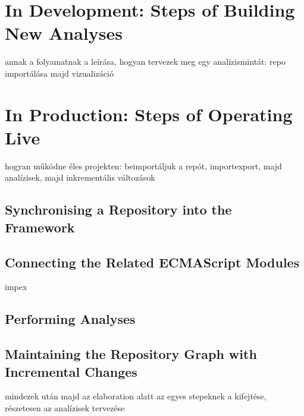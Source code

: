 \section{In Development: Steps of Building New Analyses}

annak a folyamatnak a leírása, hogyan tervezek meg egy analízismintát: repo importálása majd vizualizáció


\section{In Production: Steps of Operating Live}

hogyan működne éles projekten: beimportáljuk a repót, importexport, majd analízisek, majd inkrementális változások


\subsection{Synchronising a Repository into the Framework}


\subsection{Connecting the Related ECMAScript Modules}

impex


\subsection{Performing Analyses}


\subsection{Maintaining the Repository Graph with Incremental Changes}

mindezek után majd az elaboration alatt az egyes stepeknek a kifejtése, részetesen az analízisek tervezése